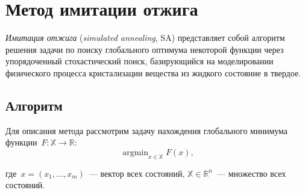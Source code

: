 \chapter{Метод имитации отжига} \label{SimulatedAnnealing}
\noindent
\textit{Имитация отжига} (\emph{simulated annealing}, SA) представляет собой алгоритм решения задачи по поиску глобального оптимума некоторой функции через упорядоченный стохастический поиск, базирующийся на моделировании физического процесса кристализации вещества из жидкого состояние в твердое.

\section{Алгоритм}

\noindent Для описания метода рассмотрим задачу нахождения глобального минимума функции~$F \colon \mathbb{X} \to \mathbb{R}$:
\[
	\mathop{\mathrm{argmin}}_{x \in \mathbb{X}} F(x),
\]

\noindent где~$x = (x_{1},\ldots , x_{m})$~--- вектор всех состояний, $\mathbb{X} \in \mathbb{R}^n$~--- множество всех состояний.

